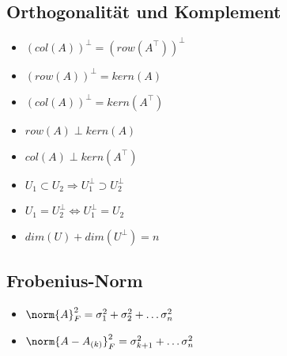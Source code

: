 \documentclass[german, 6pt]{latex4ei/latex4ei_sheet}
\begin{document}
\subsection{Orthogonalität und Komplement}
\begin{itemize}
	\item $(col(A))^\perp=(row(A^\top ))^\perp$
	\item $(row(A))^\perp = kern(A)$
	\item $(col(A))^\perp = kern(A^\top)$
	\item $row(A) \perp kern(A)$
	\item $col(A) \perp kern(A^\top)$
	\item $U_1 \subset U_2 \Rightarrow U_1^\perp \supset U_2^\perp$
	\item $U_1=U_2^\perp \Leftrightarrow U_1^\perp =U_2$
	\item $dim(U) + dim(U^\perp )=n$
\end{itemize}
\subsection{Frobenius-Norm}
\begin{itemize}
	\item $\norm{A}_F^2=\sigma_1^2+\sigma_2^2+\dots \sigma_n^2$
	\item $\norm{A-A_{(k)}}_F^2=\sigma_{k+1}^2+\dots \sigma_n^2$
\end{itemize}



\end{document}
